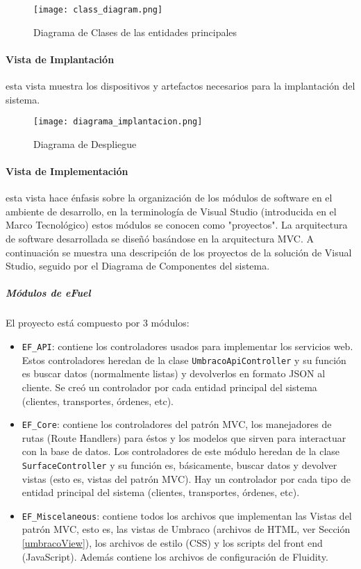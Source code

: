 \begin{figure}[H]
    \centering
    \texttt{[image: class\_diagram.png]}
    \caption{Diagrama de Clases de las entidades principales}
    \label{fig:class_diagram_main}
\end{figure}

\paragraph{Vista de Implantación} esta vista muestra los dispositivos y artefactos necesarios para la implantación del sistema.

\begin{figure}[H]
    \centering
    \texttt{[image: diagrama\_implantacion.png]}
    \caption{Diagrama de Despliegue}
    \label{fig:diagrama_implantacion}
\end{figure}

\paragraph{Vista de Implementación} esta vista hace énfasis sobre la organización de los módulos de software en el ambiente de desarrollo, en la terminología de Visual Studio (introducida en el Marco Tecnológico) estos módulos se conocen como "proyectos". La arquitectura de software desarrollada se diseñó basándose en la arquitectura MVC. A continuación se muestra una descripción de los proyectos de la solución de Visual Studio, seguido por el Diagrama de Componentes del sistema.

\subparagraph*{Módulos de eFuel} El proyecto está compuesto por 3 módulos:
\begin{itemize}
    \item \texttt{EF\_API}: contiene los controladores usados para implementar los servicios web. Estos controladores heredan de la clase \texttt{UmbracoApiController} y su función es buscar datos (normalmente listas) y devolverlos en formato JSON al cliente. Se creó un controlador por cada entidad principal del sistema (clientes, transportes, órdenes, etc).
    \item \texttt{EF\_Core}: contiene los controladores del patrón MVC, los manejadores de rutas (Route Handlers) para éstos y los modelos que sirven para interactuar con la base de datos. Los controladores de este módulo heredan de la clase \texttt{SurfaceController} y su función es, básicamente, buscar datos y devolver vistas (esto es, vistas del patrón MVC). Hay un controlador por cada tipo de entidad principal del sistema (clientes, transportes, órdenes, etc).
    \item \texttt{EF\_Miscelaneous}: contiene todos los archivos que implementan las Vistas del patrón MVC, esto es, las vistas de Umbraco (archivos de HTML, ver Sección \ref{umbracoView}), los archivos de estilo (CSS) y los scripts del front end (JavaScript). Además contiene los archivos de configuración de Fluidity.
\end{itemize}

